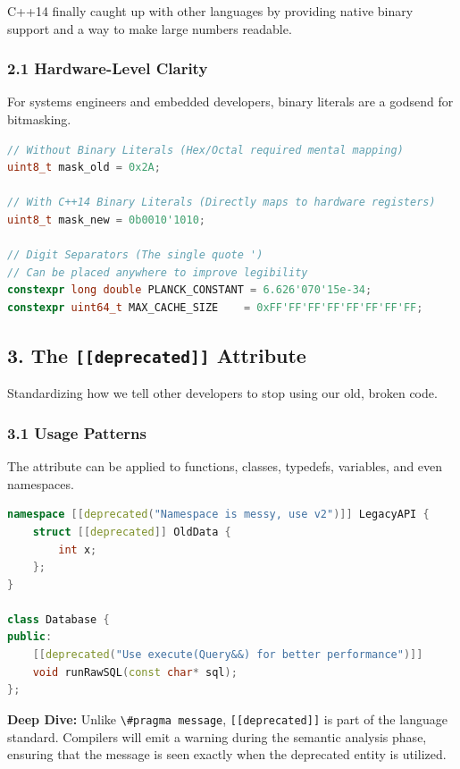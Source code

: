 C++14 finally caught up with other languages by providing native binary
support and a way to make large numbers readable.

\hypertarget{hardware-level-clarity}{%
\subsubsection{2.1 Hardware-Level
Clarity}\label{hardware-level-clarity}}

For systems engineers and embedded developers, binary literals are a
godsend for bitmasking.

\begin{lstlisting}[language={C++}]
// Without Binary Literals (Hex/Octal required mental mapping)
uint8_t mask_old = 0x2A;

// With C++14 Binary Literals (Directly maps to hardware registers)
uint8_t mask_new = 0b0010'1010;

// Digit Separators (The single quote ')
// Can be placed anywhere to improve legibility
constexpr long double PLANCK_CONSTANT = 6.626'070'15e-34;
constexpr uint64_t MAX_CACHE_SIZE    = 0xFF'FF'FF'FF'FF'FF'FF'FF;
\end{lstlisting}

\hypertarget{the-deprecated-attribute}{%
\subsection{\texorpdfstring{3. The \texttt{{[}{[}deprecated{]}{]}}
Attribute}{3. The {[}{[}deprecated{]}{]} Attribute}}\label{the-deprecated-attribute}}

Standardizing how we tell other developers to stop using our old, broken
code.

\hypertarget{usage-patterns}{%
\subsubsection{3.1 Usage Patterns}\label{usage-patterns}}

The attribute can be applied to functions, classes, typedefs, variables,
and even namespaces.

\begin{lstlisting}[language={C++}]
namespace [[deprecated("Namespace is messy, use v2")]] LegacyAPI {
    struct [[deprecated]] OldData {
        int x;
    };
}

class Database {
public:
    [[deprecated("Use execute(Query&&) for better performance")]]
    void runRawSQL(const char* sql);
};
\end{lstlisting}

\textbf{Deep Dive:} Unlike \passthrough{\lstinline!\#pragma message!},
\passthrough{\lstinline![[deprecated]]!} is part of the language
standard. Compilers will emit a warning during the semantic analysis
phase, ensuring that the message is seen exactly when the deprecated
entity is utilized.
